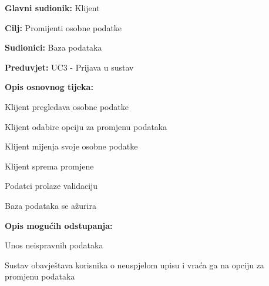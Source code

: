 					\noindent {}
					\begin{packed_item}
	
						\item \textbf{Glavni sudionik: } Klijent
						\item  \textbf{Cilj:} Promijenti osobne podatke
						\item  \textbf{Sudionici:} Baza podataka
						\item  \textbf{Preduvjet:} UC3 - Prijava u sustav
						\item  \textbf{Opis osnovnog tijeka:}
						
						\item[] \begin{packed_enum}
							
							\item Klijent pregledava osobne podatke
							\item Klijent odabire opciju za promjenu podataka
							\item Klijent mijenja svoje osobne podatke
							\item Klijent sprema promjene
							\item Podatci prolaze validaciju
							\item Baza podataka se ažurira
							
						\end{packed_enum}
						
						\item  \textbf{Opis mogućih odstupanja:}
						
						\item[] \begin{packed_item}
	
							\item[2.a] Unos neispravnih podataka
							\item[] \begin{packed_enum}
								
								\item Sustav obavještava korisnika o neuspjelom upisu i vraća ga
								na opciju za promjenu podataka
								
							\end{packed_enum}
						\end{packed_item}
					\end{packed_item}

